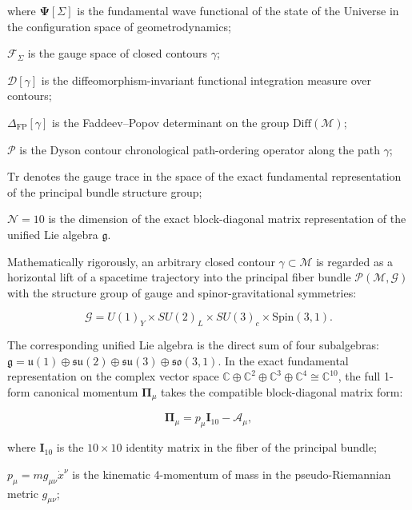 where $\mathbf{\Psi}[\Sigma]$ is the fundamental wave functional of the state of the Universe in the configuration space of geometrodynamics;  

$\mathcal{F}_\Sigma$ is the gauge space of closed contours $\gamma$;  

$\mathcal{D}[\gamma]$ is the diffeomorphism-invariant functional integration measure over contours;  

$\Delta_{\text{FP}}[\gamma]$ is the Faddeev--Popov determinant on the group $\text{Diff}(\mathcal{M})$;  

$\mathcal{P}$ is the Dyson contour chronological path-ordering operator along the path $\gamma$;  

$\text{Tr}$ denotes the gauge trace in the space of the exact fundamental representation of the principal bundle structure group;  

$\mathcal{N} = 10$ is the dimension of the exact block-diagonal matrix representation of the unified Lie algebra $\mathfrak{g}$.

Mathematically rigorously, an arbitrary closed contour $\gamma \subset \mathcal{M}$ is regarded as a horizontal lift of a spacetime trajectory into the principal fiber bundle $\mathcal{P}(\mathcal{M}, \mathcal{G})$ with the structure group of gauge and spinor-gravitational symmetries:

\begin{equation*}
\mathcal{G} = U(1)_Y \times SU(2)_L \times SU(3)_c \times \text{Spin}(3,1).
\end{equation*}

The corresponding unified Lie algebra is the direct sum of four subalgebras: $\mathfrak{g} = \mathfrak{u}(1) \oplus \mathfrak{su}(2) \oplus \mathfrak{su}(3) \oplus \mathfrak{so}(3,1)$. In the exact fundamental representation on the complex vector space $\mathbb{C} \oplus \mathbb{C}^2 \oplus \mathbb{C}^3 \oplus \mathbb{C}^4 \cong \mathbb{C}^{10}$, the full 1-form canonical momentum $\mathbf{\Pi}_\mu$ takes the compatible block-diagonal matrix form:

\begin{equation}\label{eq:1.27}\tag{1.27}
\mathbf{\Pi}_\mu = p_\mu \mathbf{I}_{10} - \mathbf{\mathcal{A}}_\mu,
\end{equation}

where $\mathbf{I}_{10}$ is the $10 \times 10$ identity matrix in the fiber of the principal bundle;  

$p_\mu = m g_{\mu\nu} \dot{x}^\nu$ is the kinematic 4-momentum of mass in the pseudo-Riemannian metric $g_{\mu\nu}$;  

